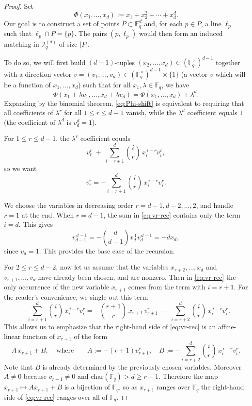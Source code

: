 \documentclass[10pt,a4paper]{amsart}
\newcommand{\F}{\mathbb{F}}
\newcommand{\II}{\mathcal{I}}
\begin{document}
\begin{proof}
Set
\[
  \Phi(x_1,\dots,x_d):=x_1+x_2^2+\cdots+x_d^d.
\]
Our goal is to construct a set of points $P\subset \F_q^d$ and, for each $p\in P$, a line $\ell_p$ such that $\ell_p\cap P=\{p\}$. The pairs $(p,\ell_p)$ would then form an induced matching in $\II_q^{(d)}$ of size $|P|$.

To do so, we will first build $(d-1)$-tuples $(x_2,\dots,x_d)\in(\F_q^\times)^{d-1}$ together with a direction vector
$v=(v_1,\dots,v_d)\in(\F_q^\times)^{d-1}\times\{1\}$
 (a vector $v$ which will be a function of $x_1,\ldots,x_{d}$) such that for all $x_1,\lambda \in \mathbb{F}_{q}$, we have
\begin{equation}\label{eq:Phi-shift}
  \Phi(x_1+\lambda v_1,\dots,x_d+\lambda v_d)=\Phi(x_1,\dots,x_d)+\lambda^d.
\end{equation}
Expanding by the binomial theorem, \eqref{eq:Phi-shift} is equivalent to requiring that all coefficients
of $\lambda^r$ for all $1\le r\le d-1$ vanish, while the $\lambda^d$ coefficient equals $1$ (the coefficient of $\lambda^d$ is $v_d^d=1$).

For $1\le r\le d-1$, the $\lambda^r$ coefficient equals
\[
  v_r^r\;+\;\sum_{i=r+1}^d \binom{i}{r}\,x_i^{\,i-r}v_i^r,
\]
so we want
\begin{equation}\label{eq:vr-rec}
  v_r^r = -\sum_{i=r+1}^d \binom{i}{r}\,x_i^{\,i-r} v_i^r.
\end{equation}

We choose the variables in decreasing order $r=d-1,d-2,\dots,2$, and handle $r=1$ at the end. When $r=d-1$, the sum in \eqref{eq:vr-rec} contains only the term $i=d$. This gives
$$v_{d-1}^{\,d-1} = -{d \choose d-1} x_d^{\,1}v_d^{\,d-1} = -d x_d,$$
since $v_{d}=1$. This provides the base case of the recursion.

For $2\le r\le d-2$, now let us assume that the variables $x_{r+2},\dots,x_d$ and $v_{r+1},\dots,v_d$ have already been chosen, and are nonzero. Then in \eqref{eq:vr-rec} the only occurrence of the new variable $x_{r+1}$ comes from the term with $i=r+1$. For the reader's convenience, we single out this term
\[
-\sum_{i=r+1}^d \binom{i}{r}\,x_i^{\,i-r} v_i^r
= -\binom{r+1}{r}\,x_{r+1}\,v_{r+1}^r \;-\; \sum_{i=r+2}^d \binom{i}{r}\,x_i^{\,i-r} v_i^r.
\]
This allows us to emphasize that the right-hand side of \eqref{eq:vr-rec} is an affine-linear function of $x_{r+1}$ of the form
\[
A\,x_{r+1}+B,\ \ \ \ \ \text{where}
\qquad
A:=-(r+1)v_{r+1}^r,\quad
B:=-\sum_{i=r+2}^d \binom{i}{r}\,x_i^{\,i-r} v_i^r.
\]
Note that $B$ is already determined by the previously chosen variables.
Moreover $A\neq 0$ because $v_{r+1}\neq 0$ and $\mathrm{char}(\F_q)>d\ge r+1$.
Therefore the map $x_{r+1}\mapsto A x_{r+1}+B$ is a bijection of $\F_q$, so as $x_{r+1}$ ranges over $\F_q$
the right-hand side of \eqref{eq:vr-rec} ranges over all of $\F_q$.


\end{proof}
\end{document}
